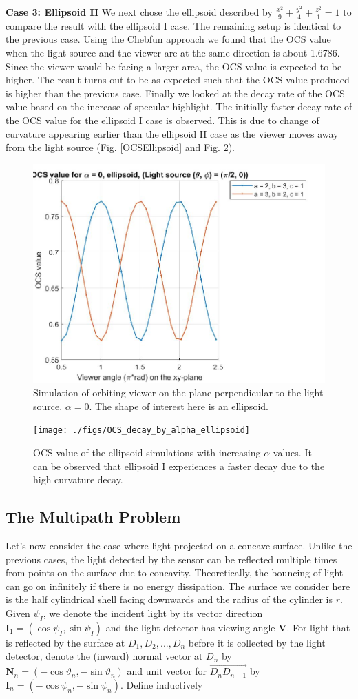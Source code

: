 \documentclass[11pt,reqno]{amsart}
\theoremstyle{definition}
\begin{document}
{\bf Case 3: Ellipsoid II} We next chose the ellipsoid described by $\frac{x^2}{9}+\frac{y^2}{4}+\frac{z^2}{1} = 1$ to compare the result with the ellipsoid I case. The remaining setup is identical to the previous case. Using the Chebfun approach we found that the OCS value when the light source and the viewer are at the same direction is about 1.6786. Since the viewer would be facing a larger area, the OCS value is expected to be higher. The result turns out to be as expected such that the OCS value produced is higher than the previous case. Finally we looked at the decay rate of the OCS value based on the increase of specular highlight. The initially faster decay rate of the OCS value for the ellipsoid I case is observed. This is due to change of curvature appearing earlier than the ellipsoid II case as the viewer moves away from the light source (Fig. \ref{OCSEllipsoid} and Fig. \ref{OCSDecaybyAlphaEllipsoid}).

\begin{figure}[h]
\includegraphics[width=.4\textwidth]{./figs/OCS_perpendicular_plane_ellipsoid}
\caption{Simulation of orbiting viewer on the plane perpendicular to the light source. $\alpha = 0$. The shape of interest here is an ellipsoid.}
\label{OCSPerpendicularPlaneEllipsoid}
\end{figure}
\begin{figure}
\texttt{[image: ./figs/OCS\_decay\_by\_alpha\_ellipsoid]}
\caption{OCS value of the ellipsoid simulations with increasing $\alpha$ values. It can be observed that ellipsoid I experiences a faster decay due to the high curvature decay.}
\label{OCSDecaybyAlphaEllipsoid}
\end{figure}

\subsection{The Multipath Problem}
Let's now consider the case where light projected on a concave surface. Unlike
the previous cases, the light detected by the sensor can be reflected multiple
times from points on the surface due to concavity.
Theoretically, the bouncing of light can go on infinitely if there is no energy
dissipation. The surface we consider here is the half cylindrical shell facing
downwards and the radius of the cylinder is $r$. Given $\psi_I$, we denote the
incident light by its vector direction
$\mathbf{I}_1=(\cos\psi_I,\sin\psi_I)$ and the light detector has viewing angle
$\mathbf{V}$. For light that is reflected by the surface at $D_1,D_2,...,D_n$
before it is collected by the light detector, denote the (inward) normal vector
at $D_n$ by $\mathbf{N}_n=(-\cos\vartheta_n,-\sin\vartheta_n)$ and unit vector
for $\overrightarrow{D_{n}D_{n-1}}$ by
$\mathbf{I}_n=(-\cos\psi_n,-\sin\psi_n)$.  Define inductively
\end{document}
